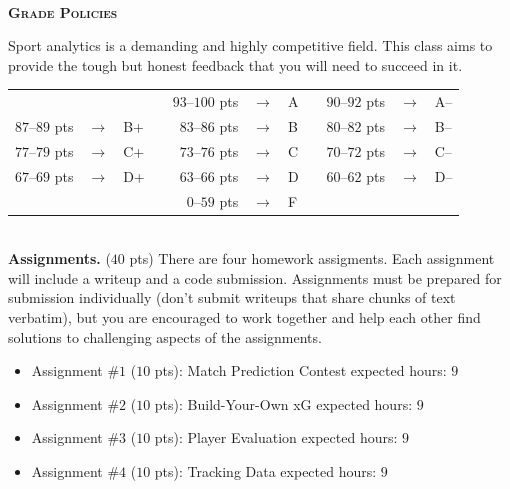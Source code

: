 \documentclass[11pt]{article}
\begin{document}
~\\
\textbf{\textsc{Grade Policies}}
\begin{adjustwidth}{1cm}{0cm}
	Sport analytics is a demanding and highly competitive field. This class aims to provide the tough but honest feedback that you will need to succeed in it.
  \begin{center}
    \begin{tabular}{rclcrclcrcl}
                      &               &     & & $93$--$100$ pts & $\rightarrow$ & A & & $90$--$92$ pts  & $\rightarrow$	& A--\\
      $87$--$89$ pts  & $\rightarrow$	& B+  & & $83$--$86$ pts  & $\rightarrow$ & B & & $80$--$82$ pts  & $\rightarrow$	& B--\\
      $77$--$79$ pts  & $\rightarrow$	& C+  & & $73$--$76$ pts  & $\rightarrow$ & C & & $70$--$72$ pts  & $\rightarrow$	& C--\\
      $67$--$69$ pts  & $\rightarrow$	& D+  & & $63$--$66$ pts  & $\rightarrow$ & D & & $60$--$62$ pts  & $\rightarrow$ & D--\\
                      &               &     & & $0$--$59$ pts   & $\rightarrow$ & F\\
    \end{tabular}
  \end{center}
  ~\\
	\textbf{Assignments.} ($40$ pts) There are four homework assigments. Each assignment will include a writeup and a code submission. Assignments must be prepared for submission individually (don't submit writeups that share chunks of text verbatim), but you are encouraged to work together and help each other find solutions to challenging aspects of the assignments.
  \begin{itemize}
    \item Assignment \#$1$ ($10$ pts): Match Prediction Contest   \hfill  expected hours: $9$
    \item Assignment \#$2$ ($10$ pts): Build-Your-Own xG          \hfill  expected hours: $9$
    \item Assignment \#$3$ ($10$ pts): Player Evaluation          \hfill  expected hours: $9$
    \item Assignment \#$4$ ($10$ pts): Tracking Data              \hfill  expected hours: $9$
  \end{itemize}


\end{adjustwidth}
\end{document}
